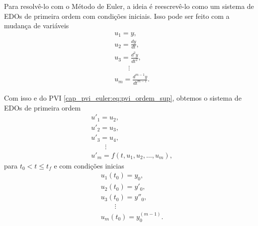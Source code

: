 Para resolvê-lo com o Método de Euler, a ideia é reescrevê-lo como um sistema de EDOs de primeira ordem com condições iniciais. Isso pode ser feito com a mudança de variáveis
\begin{align}
  &u_1 = y,\\
  &u_2 = \frac{d y}{d t},\\
  &u_3 = \frac{d^2 y}{d t^2},\\
  &\qquad\vdots\\
  &u_m = \frac{d^{m-1} y}{d t^{m-1}}.
\end{align}

Com isso e do PVI \eqref{cap_pvi_euler:eq:pvi_ordem_sup}, obtemos o sistema de EDOs de primeira ordem
\begin{subequations}
  \begin{align}
    &u'_1 = u_2,\\
    &u'_2 = u_3,\\
    &u'_3 = u_4,\\
    &\qquad\vdots\\
    &u'_{m} = f(t, u_1, u_2, \dotsc, u_{m}),
  \end{align}
\end{subequations}
para $t_0 < t \leq t_f$ e com condições inicias
\begin{subequations}
  \begin{align}
    &u_1(t_0) = y_0,\\
    &u_2(t_0) = y'_0,\\
    &u_3(t_0) = y''_0,\\
    &\qquad\vdots\\
    &u_{m}(t_0) = y^{(m-1)}_0.
  \end{align}
\end{subequations}

